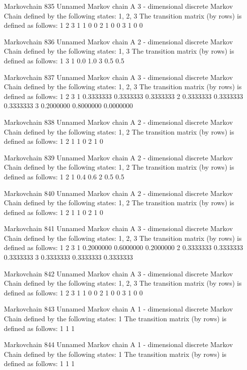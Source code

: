 \documentclass[
  nojss]{jss}
\begin{document}
\begin{CodeChunk}
\begin{CodeOutput}
Markovchain  835 
Unnamed Markov chain 
 A  3 - dimensional discrete Markov Chain defined by the following states: 
 1, 2, 3 
 The transition matrix  (by rows)  is defined as follows: 
  1 2 3
1 1 0 0
2 1 0 0
3 1 0 0

Markovchain  836 
Unnamed Markov chain 
 A  2 - dimensional discrete Markov Chain defined by the following states: 
 1, 3 
 The transition matrix  (by rows)  is defined as follows: 
    1   3
1 0.0 1.0
3 0.5 0.5

Markovchain  837 
Unnamed Markov chain 
 A  3 - dimensional discrete Markov Chain defined by the following states: 
 1, 2, 3 
 The transition matrix  (by rows)  is defined as follows: 
          1         2         3
1 0.3333333 0.3333333 0.3333333
2 0.3333333 0.3333333 0.3333333
3 0.2000000 0.8000000 0.0000000

Markovchain  838 
Unnamed Markov chain 
 A  2 - dimensional discrete Markov Chain defined by the following states: 
 1, 2 
 The transition matrix  (by rows)  is defined as follows: 
  1 2
1 1 0
2 1 0

Markovchain  839 
Unnamed Markov chain 
 A  2 - dimensional discrete Markov Chain defined by the following states: 
 1, 2 
 The transition matrix  (by rows)  is defined as follows: 
    1   2
1 0.4 0.6
2 0.5 0.5

Markovchain  840 
Unnamed Markov chain 
 A  2 - dimensional discrete Markov Chain defined by the following states: 
 1, 2 
 The transition matrix  (by rows)  is defined as follows: 
  1 2
1 1 0
2 1 0

Markovchain  841 
Unnamed Markov chain 
 A  3 - dimensional discrete Markov Chain defined by the following states: 
 1, 2, 3 
 The transition matrix  (by rows)  is defined as follows: 
          1         2         3
1 0.2000000 0.6000000 0.2000000
2 0.3333333 0.3333333 0.3333333
3 0.3333333 0.3333333 0.3333333

Markovchain  842 
Unnamed Markov chain 
 A  3 - dimensional discrete Markov Chain defined by the following states: 
 1, 2, 3 
 The transition matrix  (by rows)  is defined as follows: 
  1 2 3
1 1 0 0
2 1 0 0
3 1 0 0

Markovchain  843 
Unnamed Markov chain 
 A  1 - dimensional discrete Markov Chain defined by the following states: 
 1 
 The transition matrix  (by rows)  is defined as follows: 
  1
1 1

Markovchain  844 
Unnamed Markov chain 
 A  1 - dimensional discrete Markov Chain defined by the following states: 
 1 
 The transition matrix  (by rows)  is defined as follows: 
  1
1 1


\end{CodeOutput}
\end{CodeChunk}
\end{document}
